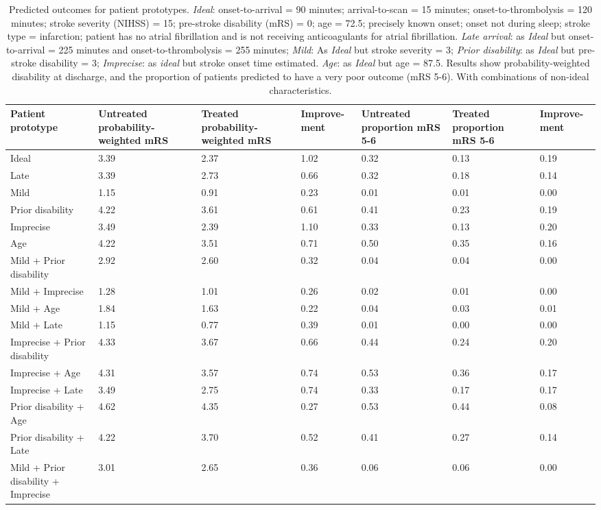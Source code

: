 \begin{minipage}{1\textwidth}
\small
\begin{longtable}{p{5.2cm} | p{1.6cm} p{1.6cm} p{1.5cm} | p{1.6cm} p{1.6cm} p{1.5cm}}
\caption{Predicted outcomes for patient prototypes. \textit{Ideal}: onset-to-arrival = 90 minutes; arrival-to-scan = 15 minutes; onset-to-thrombolysis = 120 minutes; stroke severity (NIHSS) = 15; pre-stroke disability (mRS) = 0; age = 72.5; precisely known onset; onset not during sleep; stroke type = infarction; patient has no atrial fibrillation and is not receiving anticoagulants for atrial fibrillation. \textit{Late arrival}: as \textit{Ideal} but onset-to-arrival = 225 minutes and onset-to-thrombolysis = 255 minutes; \textit{Mild}: As \textit{Ideal} but stroke severity = 3; \textit{Prior disability}: as \textit{Ideal} but pre-stroke disability = 3; \textit{Imprecise}: as \textit{ideal} but stroke onset time estimated. \textit{Age}: as \textit{Ideal} but age = 87.5. Results show probability-weighted disability at discharge, and the proportion of patients predicted to have a very poor outcome (mRS 5-6). With combinations of non-ideal characteristics.}\\
\label{tab:prototype_outcomes}
Patient prototype & Untreated probability-weighted mRS & Treated probability-weighted mRS & Improve-ment & Untreated proportion mRS 5-6 & Treated proportion mRS 5-6 & Improve-ment\\
\endhead
\midrule
Ideal & 3.39 & 2.37 & 1.02 & 0.32 & 0.13 & 0.19\\
Late & 3.39 & 2.73 & 0.66 & 0.32 & 0.18 & 0.14\\
Mild & 1.15 & 0.91 & 0.23 & 0.01 & 0.01 & 0.00\\
Prior disability & 4.22 & 3.61 & 0.61 & 0.41 & 0.23 & 0.19\\
Imprecise & 3.49 & 2.39 & 1.10 & 0.33 & 0.13 & 0.20\\
Age & 4.22 & 3.51 & 0.71 & 0.50 & 0.35 & 0.16\\
Mild + Prior disability & 2.92 & 2.60 & 0.32 & 0.04 & 0.04 & 0.00\\
Mild + Imprecise & 1.28 & 1.01 & 0.26 & 0.02 & 0.01 & 0.00\\
Mild + Age & 1.84 & 1.63 & 0.22 & 0.04 & 0.03 & 0.01\\
Mild + Late & 1.15 & 0.77 & 0.39 & 0.01 & 0.00 & 0.00\\
Imprecise + Prior disability & 4.33 & 3.67 & 0.66 & 0.44 & 0.24 & 0.20\\
Imprecise + Age & 4.31 & 3.57 & 0.74 & 0.53 & 0.36 & 0.17\\
Imprecise + Late & 3.49 & 2.75 & 0.74 & 0.33 & 0.17 & 0.17\\
Prior disability + Age & 4.62 & 4.35 & 0.27 & 0.53 & 0.44 & 0.08\\
Prior disability + Late & 4.22 & 3.70 & 0.52 & 0.41 & 0.27 & 0.14\\
Mild + Prior disability + Imprecise & 3.01 & 2.65 & 0.36 & 0.06 & 0.06 & 0.00\\
\end{longtable}
\normalsize
\end{minipage}

